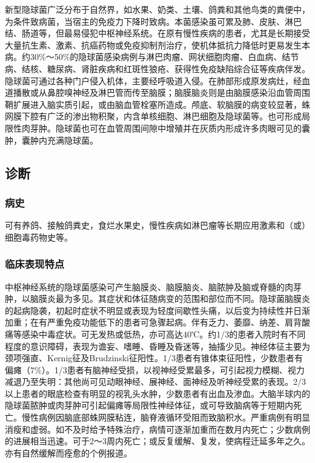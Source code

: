 新型隐球菌广泛分布于自然界，如水果、奶类、土壤、鸽粪和其他鸟类的粪便中，为条件致病菌，当宿主的免疫力下降时致病。本菌感染虽可累及肺、皮肤、淋巴结、肠道等，但最易侵犯中枢神经系统。在原有慢性疾病的患者，尤其是长期接受大量抗生素、激素、抗癌药物或免疫抑制剂治疗，使机体抵抗力降低时更易发生本病。约30\%～50\%的隐球菌感染病例与淋巴肉瘤、网状细胞肉瘤、白血病、结节病、结核、糖尿病、肾脏疾病和红斑性狼疮、获得性免疫缺陷综合征等疾病伴发。隐球菌可通过各种门户侵入机体，主要经呼吸道入侵。在肺部形成原发病灶，经血道播散或从鼻腔嗅神经及淋巴管而传至脑膜；脑膜脑炎则是由脑膜感染沿血管周围鞘扩展进入脑实质引起，或由脑血管栓塞所造成。颅底、软脑膜的病变较显著，蛛网膜下腔有广泛的渗出物积聚，内含单核细胞、淋巴细胞及隐球菌等。也可形成局限性肉芽肿。隐球菌也可在血管周围间隙中增殖并在灰质内形成许多肉眼可见的囊肿，囊肿内充满隐球菌。

\subsection{诊断}

\subsubsection{病史}

可有养鸽、接触鸽粪史，食烂水果史，慢性疾病如淋巴瘤等长期应用激素和（或）细胞毒药物史等。

\subsubsection{临床表现特点}

中枢神经系统的隐球菌感染可产生脑膜炎、脑膜脑炎、脑脓肿及脑或脊髓的肉芽肿，以脑膜炎最为多见。其症状和体征随病变的范围和部位而不同。隐球菌脑膜炎的起病隐袭，初起时症状不明显或表现为轻度间歇性头痛，以后变为持续性并日渐加重；在有严重免疫功能低下的患者可急骤起病。伴有乏力、萎靡、纳差、肩背酸痛等感染中毒症状。可无发热或低热，亦可高达40℃。约1/3的患者入院时有不同程度的意识障碍，表现为谵妄、嗜睡、昏睡及昏迷等，抽搐少见。神经体征主要为颈项强直、Kernig征及Brudzinski征阳性。1/3患者有锥体束征阳性，少数患者有偏瘫（7\%）。1/3患者有脑神经受损，以视神经受累最多，可引起视力模糊、视力减退乃至失明：其他尚可见动眼神经、展神经、面神经及听神经受累的表现。2/3以上患者的眼底检查有明显的视乳头水肿，少数患者有出血及渗血。大脑半球内的隐球菌脓肿或肉芽肿可引起偏瘫等局限性神经体征，或可导致脑病等于短期内死亡。慢性病例因脑底部蛛网膜粘连，脑脊液循环受阻而致脑积水。严重病例有明显消瘦和虚弱。如不及时给予特殊治疗，病情可逐渐加重而在数月内死亡；少数病例的进展相当迅速。可于2～3周内死亡；或反复缓解、复发，使病程迁延多年之久。亦有自然缓解而痊愈的个例报道。

